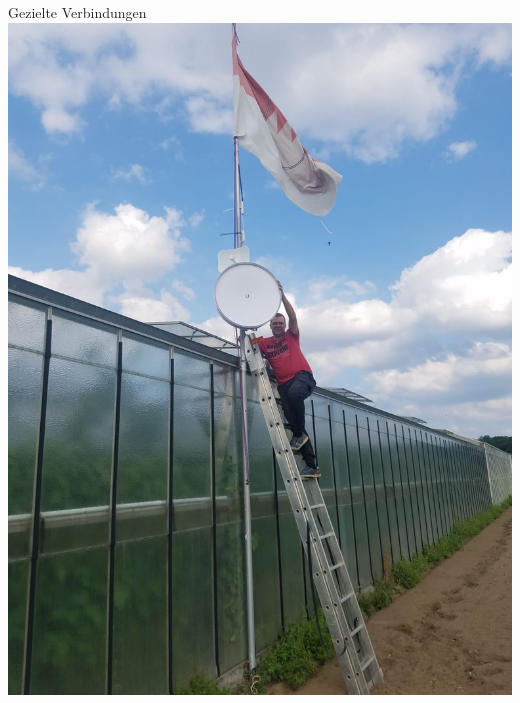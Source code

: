 \documentclass{beamer}
\begin{document}
	\begin{frame}[standout]{Gezielte Verbindungen}
		\includegraphics[height=0.9\textheight]{media/p2p-treibhaus.jpg}
	\end{frame}
\end{document}
